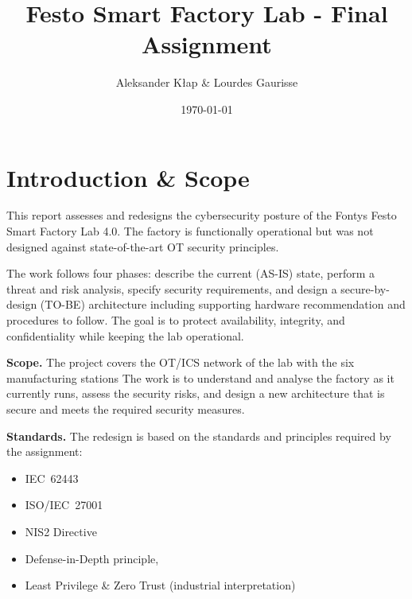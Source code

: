 \documentclass[11pt,a4paper]{article}
\title{Festo Smart Factory Lab - Final Assignment}
\author{Aleksander Kłap \& Lourdes Gaurisse}
\date{\today}
\begin{document}
\maketitle

\tableofcontents
\listoftables
\listoffigures
\setcounter{page}{3}

\pagebreak

\pagebreak

\section{Introduction \& Scope}
This report assesses and redesigns the cybersecurity posture of the 
Fontys Festo Smart Factory Lab 4.0. The factory is functionally operational
but was not designed against state-of-the-art OT security
principles.
\vspace{1em}

The work follows four phases: describe the current (AS-IS) state, perform a
threat and risk analysis, specify security requirements, and design a
secure-by-design (TO-BE) architecture including supporting hardware
recommendation and procedures to follow. The goal is to protect availability,
integrity, and confidentiality while keeping the lab operational.

\vspace{1em}
\textbf{Scope.} The project covers the OT/ICS network of the
lab with the six manufacturing stations The work is to understand and
analyse the factory as it currently runs, assess the
security risks, and design a new architecture that is secure
and meets the required security measures.
\vspace{1em}

\textbf{Standards.} The redesign is based on the standards
and principles required by the assignment: 
\begin{itemize}
    \item IEC~62443
    \item ISO/IEC~27001
    \item NIS2 Directive
    \item Defense-in-Depth principle, 
    \item Least Privilege \& Zero Trust (industrial interpretation)
\end{itemize}

\pagebreak
\end{document}
